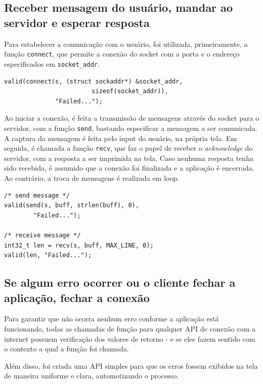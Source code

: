 \documentclass[10pt,twocolumn,letterpaper]{article}
\begin{document}
\subsection{Receber mensagem do usuário, mandar ao servidor e esperar resposta}
    Para estabelecer a comunicação com o usuário, foi utilizada, primeiramente,
a função \texttt{connect}, que permite a conexão do socket com a porta e o endereço
especificados em \texttt{socket\_addr}.

\begin{lstlisting}[caption={Estabelecimento da conexão com o servidor}, label=Algorithm]
valid(connect(s, (struct sockaddr*) &socket_addr, 
                        sizeof(socket_addr)), 
              "Failed...");
\end{lstlisting}

    Ao iniciar a conexão, é feita a transmissão de mensagens através do socket
para o servidor, com a função \texttt{send}, bastando especificar a mensagem a ser
comunicada. A captura da mensagem é feita pelo input do usuário, na própria tela.
    Em seguida, é chamada a função \texttt{recv}, que faz o papel de receber
o \textit{acknowledge} do servidor, com a resposta a ser imprimida na tela. Caso
nenhuma resposta tenha sido recebida, é assumido que a conexão foi finalizada e 
a aplicação é encerrada. Ao contrário, a troca de mensagens é realizada em loop.

\begin{lstlisting}[caption={Envio e recebimento de mensagens}, label=Algorithm]
/* send message */
valid(send(s, buff, strlen(buff), 0),
        "Failed...");

/* receive message */
int32_t len = recv(s, buff, MAX_LINE, 0);
valid(len, "Failed...");
\end{lstlisting}

\subsection{Se algum erro ocorrer ou o cliente fechar a aplicação, fechar a conexão}
    Para garantir que não ocorra nenhum erro conforme a aplicação está funcionando,
todas as chamadas de função para qualquer API de conexão com a internet possuem verificação
dos valores de retorno - e se eles fazem sentido com o contexto a qual a função foi chamada.

    Além disso, foi criada uma API simples para que os erros fossem exibidos na tela
de maneira uniforme e clara, automotizando o processo.
\end{document}
